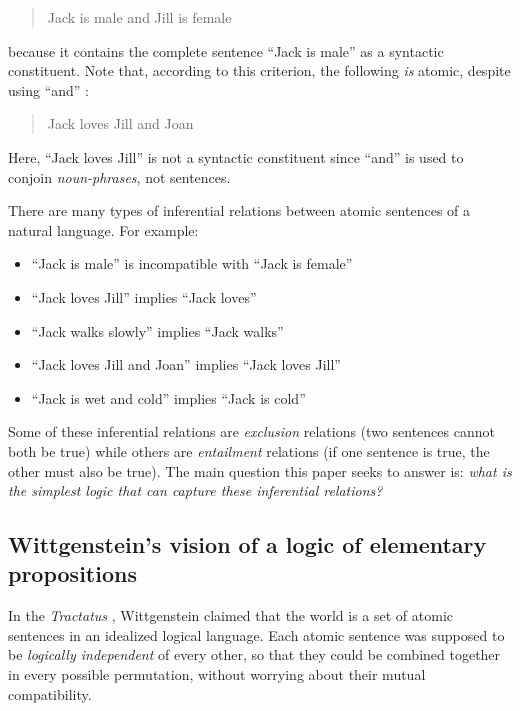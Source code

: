 \begin{quote}
  Jack is male and Jill is female
\end{quote}

\NI because it contains the complete sentence ``Jack is male'' as a
syntactic constituent.  Note that, according to this criterion, the
following \emph{is} atomic, despite using ``and'' :

\begin{quote}
  Jack loves Jill and Joan
\end{quote}

\NI Here, ``Jack loves Jill'' is not a syntactic constituent since
``and'' is used to conjoin \emph{noun-phrases}, not sentences.

There are many types of inferential relations between atomic
sentences of a natural language.  For example:

\begin{itemize}

\item ``Jack is male'' is incompatible with ``Jack is female''
\item ``Jack loves Jill'' implies ``Jack loves''
\item ``Jack walks slowly'' implies ``Jack walks''
\item ``Jack loves Jill and Joan'' implies ``Jack loves Jill''
\item ``Jack is wet and cold'' implies ``Jack is cold''

\end{itemize}

\NI Some of these inferential relations are \emph{exclusion}
relations (two sentences cannot both be true) while others are
\emph{entailment} relations (if one sentence is true, the other must
also be true).  The main question this paper seeks to answer is:
\emph{what is the simplest logic that can capture these inferential
  relations?}

\subsection{Wittgenstein's vision of a logic of elementary propositions}

\NI In the \emph{Tractatus} \cite{wittgenstein-tractatus}, Wittgenstein
claimed that the world is a set of atomic sentences in an idealized
logical language.  Each atomic sentence was supposed to be
\emph{logically independent} of every other, so that they could be
combined together in every possible permutation, without worrying
about their mutual compatibility.


